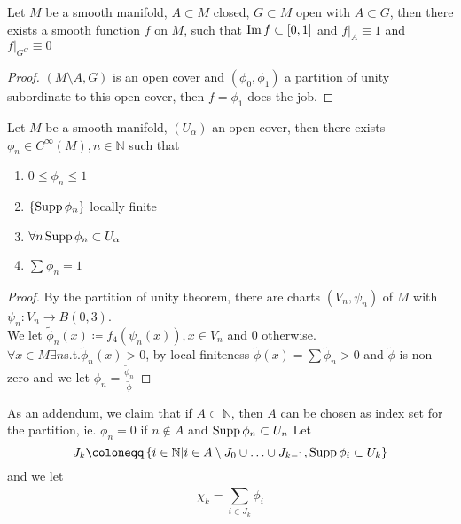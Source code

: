 \documentclass[../main.tex]{subfiles}
\begin{document}
\begin{propo}
Let $M $ be a smooth manifold, $A \subset M$ closed, $G \subset M$ open with $A \subset G$, then there exists a smooth function $f$ on $M$, such that $\operatorname{Im} f \subset [ 0,1] $ and $f|_A \equiv 1$ and $f|_{G^{C}}  \equiv 0$ 
\end{propo}
\begin{proof}
$( M\setminus A,G) $ is an open cover and $( \phi_0,\phi_1) $ a partition of unity subordinate to this open cover, then $f= \phi_1$ does the job.
\end{proof}
\begin{thm}
Let $M$ be a smooth manifold, $( U_\alpha) $ an open cover, then there exists $\phi_n \in C^{ \infty }( M), n \in \mathbb{N}	 $ such that
\begin{enumerate}
\item $0 \leq \phi_n \leq 1$ 
\item $ \left\{ \operatorname{Supp} \phi_n \right\} $ locally finite
\item $\forall n \operatorname{Supp} \phi_n \subset U_\alpha$ 
\item $ \sum_{}^{ } \phi_n = 1 $ 
\end{enumerate}
\end{thm}
\begin{proof}
By the partition of unity theorem, there are charts $( V_n, \psi_n) $ of $M$ with $\psi_n:V_n \to B( 0,3) $.\\
We let $\tilde\phi_n( x) \coloneqq  f_4( \psi_n( x) ) , x \in V_n$ and $0$ otherwise.\\
$\forall x \in M\exists n $s.t.$ \tilde\phi_n ( x) >0$, by local finiteness $\tilde\phi( x) = \sum \tilde\phi_n >0$ and $\tilde\phi$ is non zero and we let $\phi_n = \frac{\tilde\phi_n}{\tilde\phi}$ 
\end{proof}
As an addendum, we claim that if $A \subset \mathbb{N}$, then $A$ can be chosen as index set for the partition, ie. $\phi_n=0$ if $n \notin A$ and $\operatorname{Supp} \phi_n \subset U_n$ 
Let
\[ 
J_k \coloneqq \left\{ i \in \mathbb{N}| i \in A \setminus J_0\cup \ldots \cup J_{k-1} , \supp \phi_i \subset U_k \right\} 
\]
and we let 
\[ 
\chi_k = \sum_{i\in J_k}^{ } \phi_i
\]
\end{document}
